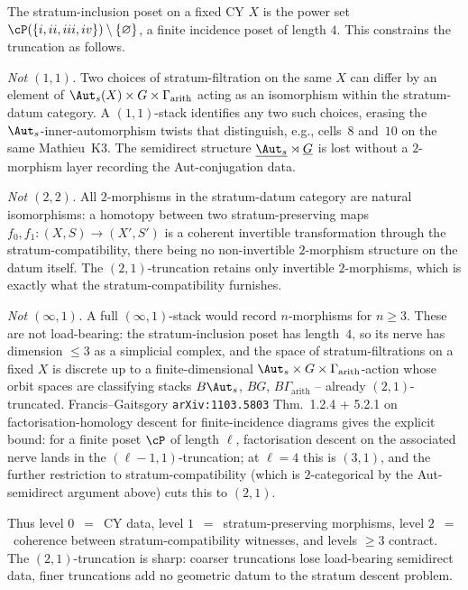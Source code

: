 \begin{remark}
\label{gluing:rem:2-1-truncation-justification}
The stratum-inclusion poset on a fixed CY $X$ is the power set
$\cP(\{i,ii,iii,iv\})\setminus\{\varnothing\}$, a finite incidence
poset of length $4$. This constrains the truncation as follows.

\emph{Not $(1,1)$.} Two choices of stratum-filtration on the same $X$
can differ by an element of $\Aut_{s}(X)\times G\times
\Gamma_{\mathrm{arith}}$ acting as an isomorphism within the
stratum-datum category. A $(1,1)$-stack identifies any two such
choices, erasing the $\Aut_{s}$-inner-automorphism twists that
distinguish, e.g., cells~$8$ and~$10$ on the same Mathieu~K3. The
semidirect structure $\underline{\Aut_{s}}\rtimes\underline{G}$ is
lost without a $2$-morphism layer recording the Aut-conjugation
data.

\emph{Not $(2,2)$.} All $2$-morphisms in the stratum-datum category
are natural isomorphisms: a homotopy between two stratum-preserving
maps $f_{0},f_{1}\colon (X,S)\to(X',S')$ is a coherent invertible
transformation through the stratum-compatibility, there being no
non-invertible $2$-morphism structure on the datum itself. The
$(2,1)$-truncation retains only invertible $2$-morphisms, which is
exactly what the stratum-compatibility furnishes.

\emph{Not $(\infty,1)$.} A full $(\infty,1)$-stack would record
$n$-morphisms for $n\geq 3$. These are not load-bearing: the
stratum-inclusion poset has length~$4$, so its nerve has dimension
$\leq 3$ as a simplicial complex, and the space of stratum-filtrations
on a fixed $X$ is discrete up to a finite-dimensional $\Aut_{s}\times
G\times\Gamma_{\mathrm{arith}}$-action whose orbit spaces are
classifying stacks $B\Aut_{s}$, $BG$, $B\Gamma_{\mathrm{arith}}$
-- already $(2,1)$-truncated. Francis--Gaitsgory
\texttt{arXiv:1103.5803} Thm.~1.2.4 + 5.2.1 on factorisation-homology
descent for finite-incidence diagrams gives the explicit bound: for
a finite poset $\cP$ of length $\ell$, factorisation descent on the
associated nerve lands in the $(\ell-1,1)$-truncation; at $\ell=4$
this is $(3,1)$, and the further restriction to stratum-compatibility
(which is $2$-categorical by the Aut-semidirect argument above) cuts
this to $(2,1)$.

Thus level $0$~$=$~CY data, level $1$~$=$~stratum-preserving
morphisms, level $2$~$=$~coherence between stratum-compatibility
witnesses, and levels $\geq 3$ contract. The $(2,1)$-truncation is
sharp: coarser truncations lose load-bearing semidirect data, finer
truncations add no geometric datum to the stratum descent problem.
\end{remark}

